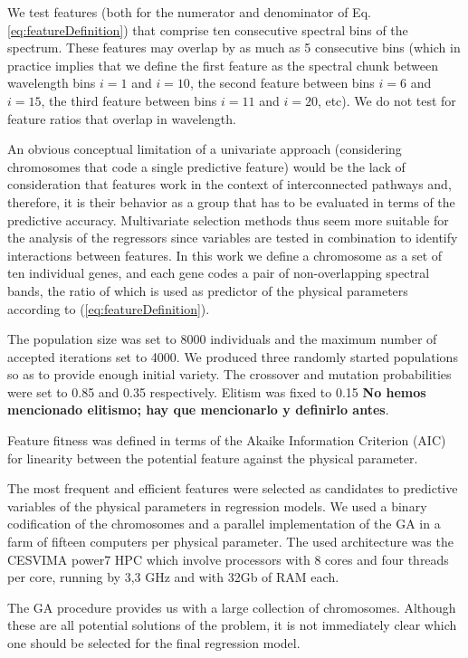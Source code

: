 We test features (both for the numerator and denominator of
Eq. \ref{eq:featureDefinition}) that comprise ten consecutive spectral
bins of the spectrum. These features may overlap by as much as 5
consecutive bins (which in practice implies that we define the first
feature as the spectral chunk between wavelength bins $i=1$ and
$i=10$, the second feature between bins $i=6$ and $i=15$, the third
feature between bins $i=11$ and $i=20$, etc). We do not test for
feature ratios that overlap in wavelength.


An obvious conceptual limitation of a univariate approach (considering
chromosomes that code a single predictive feature) would be the lack
of consideration that features work in the context of interconnected
pathways and, therefore, it is their behavior as a group that has to
be evaluated in terms of the predictive accuracy. Multivariate
selection methods thus seem more suitable for the analysis of the
regressors since variables are tested in combination to identify
interactions between features. In this work we define a chromosome as
a set of ten individual genes, and each gene codes a pair of
non-overlapping spectral bands, the ratio of which is used as
predictor of the physical parameters according
to (\ref{eq:featureDefinition}). 

The population size was set to 8000 individuals and the maximum number
of accepted iterations set to 4000. We produced three randomly started
populations so as to provide enough initial variety. The crossover and
mutation probabilities were set to 0.85 and 0.35 respectively. Elitism
was fixed to 0.15 {\bf No hemos mencionado elitismo; hay que
mencionarlo y definirlo antes}.

Feature fitness was defined in terms of the Akaike Information
Criterion (AIC) for linearity between the potential feature against
the physical parameter.

The most frequent and efficient features were selected as candidates
to predictive variables of the physical parameters in regression
models. We used a binary codification of the chromosomes and a
parallel implementation of the GA in a farm of fifteen computers per
physical parameter. The used architecture was the CESVIMA power7 HPC
which involve processors with 8 cores and four threads per core, running by 3,3 GHz
and with 32Gb of RAM each.


The GA procedure provides us with a large collection of chromosomes.
Although these are all potential solutions of the problem, it is not
immediately clear which one should be selected for the final
regression model.  

